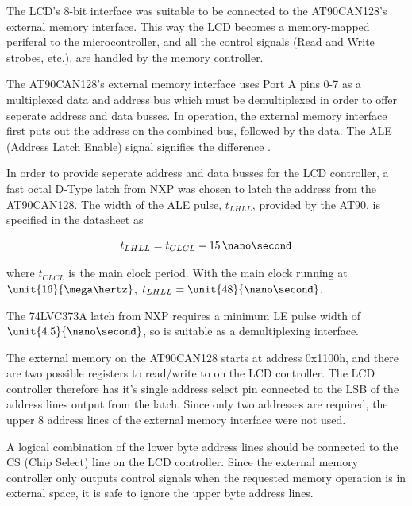 The LCD's 8-bit interface was suitable to be connected to the AT90CAN128's external memory interface. This way the LCD becomes a memory-mapped periferal to the microcontroller, and all the control signals (Read and Write strobes, etc.), are handled by the memory controller.

The AT90CAN128's external memory interface uses Port A pins 0-7 as a multiplexed data and address bus which must be demultiplexed in order to offer seperate address and data busses. In operation, the external memory interface first puts out the address on the combined bus, followed by the data. The ALE (Address Latch Enable) signal signifies the difference \cite{AT90CAN}.

In order to provide seperate address and data busses for the LCD controller, a fast octal D-Type latch from NXP was chosen to latch the address from the AT90CAN128. The width of the ALE pulse, $t_{LHLL}$, provided by the AT90, is specified in the datasheet as


\begin{equation}
t_{LHLL}=t_{CLCL}-15\, \nano\second
\end{equation}

where $t_{CLCL}$ is the main clock period. With the main clock running at $\unit{16}{\mega\hertz}$, $t_{LHLL}=\unit{48}{\nano\second}$.


The 74LVC373A latch from NXP requires a minimum LE pulse width of $\unit{4.5}{\nano\second}$, so is suitable as a demultiplexing interface.

The external memory on the AT90CAN128 starts at address 0x1100h, and there are two possible registers to read/write to on the LCD controller. The LCD controller therefore has it's single address select pin connected to the LSB of the address lines output from the latch. Since only two addresses are required, the upper 8 address lines of the external memory interface were not used.

A logical combination of the lower byte address lines should be connected to the CS (Chip Select) line on the LCD controller. Since the external memory controller only outputs control signals when the requested memory operation is in external space, it is safe to ignore the upper byte address lines.

